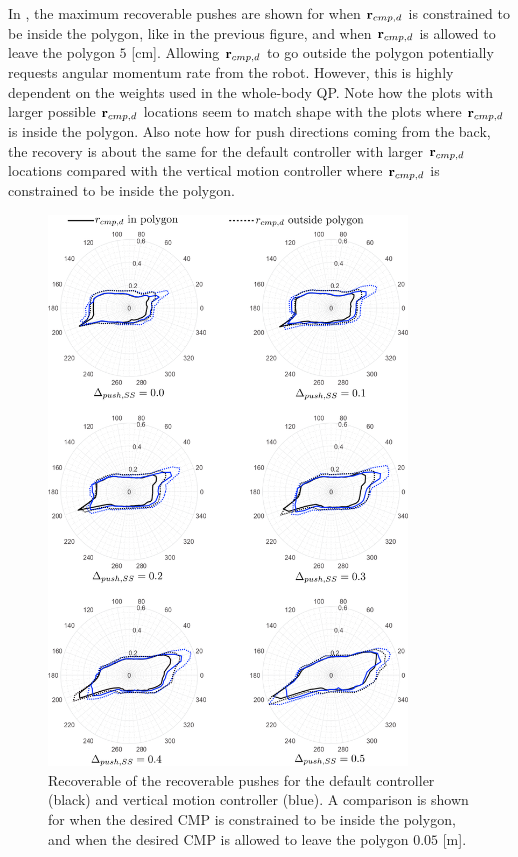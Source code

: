 In , the maximum recoverable pushes are shown for when $\mathbf{r}_{cmp,d}$ is constrained to be inside the polygon, like in the previous figure, and when $\mathbf{r}_{cmp,d}$ is allowed to leave the polygon $5$ [cm]. Allowing $\mathbf{r}_{cmp,d}$ to go outside the polygon potentially requests angular momentum rate from the robot. However, this is highly dependent on the weights used in the whole-body \ac{QP}. Note how the plots with larger possible $\mathbf{r}_{cmp,d}$ locations seem to match shape with the plots where $\mathbf{r}_{cmp,d}$ is inside the polygon. Also note how for push directions coming from the back, the recovery is about the same for the default controller with larger $\mathbf{r}_{cmp,d}$ locations compared with the vertical motion controller where $\mathbf{r}_{cmp,d}$ is constrained to be inside the polygon.
\begin{figure}
     \centering
        \includegraphics[width=0.85\textwidth]{STYLESTUFF/roundAng.png}
        \caption{Recoverable of the recoverable pushes for the default controller (black) and vertical motion controller (blue). A comparison is shown for when the desired \ac{CMP} is constrained to be inside the polygon, and when the desired \ac{CMP} is allowed to leave the polygon $0.05$ [m].}
        \label{fig:roundPushAng}
\end{figure}

